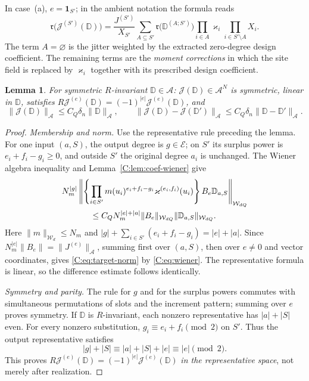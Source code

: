 \documentclass[11pt]{article}
\newtheorem{lemma}[lemma]{Lemma}
\newcommand{\cW}{\mathcal{W}}
\newcommand{\cA}{\mathcal{A}}
\newcommand{\cE}{\mathcal{E}}
\newcommand{\cJ}{\mathcal{J}}
\newcommand{\norm}[1]{\lVert #1\rVert}
\newcommand{\abs}[1]{\lvert #1\rvert}
\newcommand{\one}{\mathbf{1}}
\newcommand{\realize}{\mathfrak r}
\begin{document}
In case~(a), \(e=\one_{S'}\); in the ambient notation the formula reads
\[
 \realize\bigl(\cJ^{(S')}(\mathbb D)\bigr)
 =\frac{J^{(S')}}{X_{S'}}
   \sum_{A\subseteq S'}\realize\bigl(\mathbb D^{(A;S')}\bigr)
       \prod_{i\in A}\varkappa_i\prod_{i\in S'\setminus A}X_i.
\]
The term \(A=\varnothing\) is the jitter weighted by the extracted
zero-degree design coefficient.  The remaining terms are the
\emph{moment corrections} in which the site field is replaced by
\(\varkappa_i\) together with its prescribed design coefficient.

\begin{lemma}\label{C:lem:target}
For symmetric \(R\)-invariant \(\mathbb D\in\cA\): \(\cJ(\mathbb D)\in\cA^N\)
is symmetric, linear in \(\mathbb D\), satisfies
\(R\cJ^{(e)}(\mathbb D)=(-1)^{\abs e}\cJ^{(e)}(\mathbb D)\), and
\begin{equation}
 \norm{\cJ(\mathbb D)}_\cA\le C_Q\delta_n\norm{\mathbb D}_\cA,\qquad
 \norm{\cJ(\mathbb D)-\cJ(\mathbb D')}_\cA\le C_Q\delta_n\norm{\mathbb D-\mathbb D'}_\cA .
 \label{C:eq:target-norm}
\end{equation}
\end{lemma}
\begin{proof}
\emph{Membership and norm.}  Use the representative rule preceding the
lemma.  For one input \((a,S)\), the output degree is \(g\in\cE\);
on \(S'\) its surplus power is \(e_i+f_i-g_i\ge0\), and outside
\(S'\) the original degree \(a_i\) is unchanged.  The Wiener algebra
inequality and Lemma~\ref{C:lem:coef-wiener} give
\[
 \begin{aligned}
 &N_m^{\abs g}
 \left\|\left\{\prod_{i\in S'}
 m(u_i)^{e_i+f_i-g_i}\varkappa^{(e_i,f_i)}(u_i)\right\}
 B_e\mathbb D_{a,S}\right\|_{\cW_{dQ}}\\
 &\hspace{12mm}\le
 C_QN_m^{\abs e+\abs a}\norm{B_e}_{\cW_{dQ}}
                            \norm{\mathbb D_{a,S}}_{\cW_{dQ}} .
 \end{aligned}
\]
Here \(\norm m_{\cW_d}\le N_m\) and
\(\abs g+\sum_{i\in S'}(e_i+f_i-g_i)=\abs e+\abs a\).
Since \(N_m^{\abs e}\norm{B_e}=\norm{J^{(e)}}_\cA\), summing first over
\((a,S)\), then over \(e\ne0\) and vector coordinates, gives
\eqref{C:eq:target-norm} by \eqref{C:eq:wiener}.  The representative
formula is linear, so the difference estimate follows identically.

\emph{Symmetry and parity.}  The rule for \(g\) and for the surplus powers
commutes with simultaneous permutations of slots and the increment
pattern; summing over \(e\) proves symmetry.  If \(\mathbb D\) is
\(R\)-invariant, each nonzero representative has
\(\abs a+\abs S\) even.  For every nonzero substitution,
\(g_i\equiv e_i+f_i\pmod2\) on \(S'\).  Thus the output representative
satisfies
\[
 \abs g+\abs S\equiv\abs a+\abs S+\abs e
       \equiv\abs e\pmod2.
\]
This proves \(R\cJ^{(e)}(\mathbb D)=(-1)^{\abs e}\cJ^{(e)}(\mathbb D)\)
\emph{in the representative space}, not merely after realization.
\end{proof}
\end{document}
